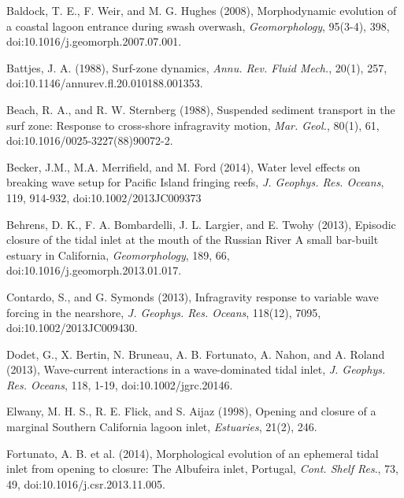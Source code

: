 \begin{thebibliography}{\textit{Ranasinghe and Patttiaratchi}(2003)}
Baldock,
T. E., F. Weir, and M. G. Hughes (2008), Morphodynamic evolution of
a coastal lagoon entrance during swash overwash, \emph{Geomorphology},
95(3-4), 398, doi:10.1016/j.geomorph.2007.07.001.

Battjes, J. A. (1988),
Surf-zone dynamics, \emph{Annu. Rev. Fluid Mech.}, 20(1), 257,
doi:10.1146/annurev.fl.20.010188.001353. 

Beach,
R. A., and R. W. Sternberg (1988), Suspended sediment transport in
the surf zone: Response to cross-shore infragravity motion, \emph{Mar.
Geol.}, 80(1), 61, doi:10.1016/0025-3227(88)90072-2. 

Becker, J.M.,
M.A. Merrifield, and M. Ford (2014), Water level effects on breaking
wave setup for Pacific Island fringing reefs, \emph{J. Geophys. Res.
Oceans}, 119, 914-932, doi:10.1002/2013JC009373

Behrens,
D. K., F. A. Bombardelli, J. L. Largier, and E. Twohy (2013), Episodic
closure of the tidal inlet at the mouth of the Russian River \textemdash{}
A small bar-built estuary in California, \emph{Geomorphology}, 189,
66, doi:10.1016/j.geomorph.2013.01.017. 

Contardo,
S., and G. Symonds (2013), Infragravity response to variable wave
forcing in the nearshore, \emph{J. Geophys. Res. Oceans}, 118(12),
7095, doi:10.1002/2013JC009430. 

Dodet, G.,
X. Bertin, N. Bruneau, A. B. Fortunato, A. Nahon, and A. Roland (2013),
Wave-current interactions in a wave-dominated tidal inlet, \emph{J.
Geophys. Res. Oceans}, 118, 1-19, doi:10.1002/jgrc.20146.

Elwany, M.
H. S., R. E. Flick, and S. Aijaz (1998), Opening and closure of a
marginal Southern California lagoon inlet, \emph{Estuaries}, 21(2),
246. 

Fortunato,
A. B. et al. (2014), Morphological evolution of an ephemeral tidal
inlet from opening to closure: The Albufeira inlet, Portugal, \emph{Cont.
Shelf Res}., 73, 49, doi:10.1016/j.csr.2013.11.005.


\end{thebibliography}
